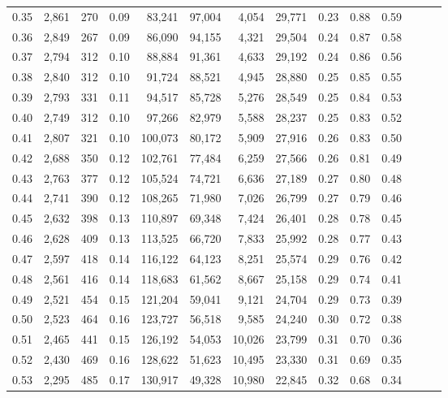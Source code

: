 \begin{tabular}{rrrrrrrrrrrrrr}
0.35 &  2,861 &    270 &  0.09 &   83,241 &   97,004 &   4,054 &  29,771 &  0.23 &  0.88 &      0.59 \\
0.36 &  2,849 &    267 &  0.09 &   86,090 &   94,155 &   4,321 &  29,504 &  0.24 &  0.87 &      0.58 \\
0.37 &  2,794 &    312 &  0.10 &   88,884 &   91,361 &   4,633 &  29,192 &  0.24 &  0.86 &      0.56 \\
0.38 &  2,840 &    312 &  0.10 &   91,724 &   88,521 &   4,945 &  28,880 &  0.25 &  0.85 &      0.55 \\
0.39 &  2,793 &    331 &  0.11 &   94,517 &   85,728 &   5,276 &  28,549 &  0.25 &  0.84 &      0.53 \\
0.40 &  2,749 &    312 &  0.10 &   97,266 &   82,979 &   5,588 &  28,237 &  0.25 &  0.83 &      0.52 \\
0.41 &  2,807 &    321 &  0.10 &  100,073 &   80,172 &   5,909 &  27,916 &  0.26 &  0.83 &      0.50 \\
0.42 &  2,688 &    350 &  0.12 &  102,761 &   77,484 &   6,259 &  27,566 &  0.26 &  0.81 &      0.49 \\
0.43 &  2,763 &    377 &  0.12 &  105,524 &   74,721 &   6,636 &  27,189 &  0.27 &  0.80 &      0.48 \\
0.44 &  2,741 &    390 &  0.12 &  108,265 &   71,980 &   7,026 &  26,799 &  0.27 &  0.79 &      0.46 \\
0.45 &  2,632 &    398 &  0.13 &  110,897 &   69,348 &   7,424 &  26,401 &  0.28 &  0.78 &      0.45 \\
0.46 &  2,628 &    409 &  0.13 &  113,525 &   66,720 &   7,833 &  25,992 &  0.28 &  0.77 &      0.43 \\
0.47 &  2,597 &    418 &  0.14 &  116,122 &   64,123 &   8,251 &  25,574 &  0.29 &  0.76 &      0.42 \\
0.48 &  2,561 &    416 &  0.14 &  118,683 &   61,562 &   8,667 &  25,158 &  0.29 &  0.74 &      0.41 \\
0.49 &  2,521 &    454 &  0.15 &  121,204 &   59,041 &   9,121 &  24,704 &  0.29 &  0.73 &      0.39 \\
0.50 &  2,523 &    464 &  0.16 &  123,727 &   56,518 &   9,585 &  24,240 &  0.30 &  0.72 &      0.38 \\
0.51 &  2,465 &    441 &  0.15 &  126,192 &   54,053 &  10,026 &  23,799 &  0.31 &  0.70 &      0.36 \\
0.52 &  2,430 &    469 &  0.16 &  128,622 &   51,623 &  10,495 &  23,330 &  0.31 &  0.69 &      0.35 \\
0.53 &  2,295 &    485 &  0.17 &  130,917 &   49,328 &  10,980 &  22,845 &  0.32 &  0.68 &      0.34 \\

\end{tabular}
